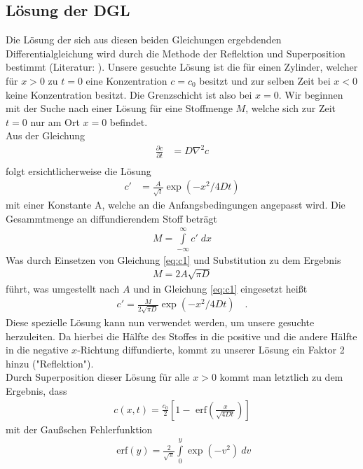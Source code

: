 \documentclass[12pt,a4paper,titlepage,headinclude,bibtotoc]{scrartcl}
\newcommand{\erf}[1]{\text{ erf}\ensuremath{\left( #1 \right)}}
\begin{document}
\subsection{Lösung der DGL}
Die Lösung der sich aus diesen beiden Gleichungen ergebdenden Differentialgleichung wird durch die Methode der Reflektion und Superposition bestimmt (Literatur: \cite[S. 11]{crank}).
Unsere gesuchte Lösung ist die für einen Zylinder, welcher für $x>0$ zu $t=0$ eine Konzentration $c=c_0$ besitzt und zur selben Zeit bei $x<0$ keine Konzentration besitzt.
Die Grenzschicht ist also bei $x=0$.
Wir beginnen mit der Suche nach einer Lösung für eine Stoffmenge $M$, welche sich zur Zeit $t=0$ nur am Ort $x=0$ befindet.\\
Aus der Gleichung
\begin{align*}
\frac{\partial c}{\partial t}&=D\nabla^2 c\\
\end{align*}
folgt ersichtlicherweise die Lösung
\begin{align}
c'&=\frac{A}{\sqrt{t}}\exp\left(-x^2/4Dt \right)\label{eq:c1}
\end{align}
mit einer Konstante A, welche an die Anfangsbedingungen angepasst wird.
Die Gesammtmenge an diffundierendem Stoff beträgt
\begin{align*}
M=\int\limits_{-\infty}^\infty c' \; dx
\end{align*}
Was durch Einsetzen von Gleichung \eqref{eq:c1} und Substitution zu dem Ergebnis
\begin{align*}
M=2A\sqrt{\pi D}
\end{align*}
führt, was umgestellt nach $A$ und in Gleichung \eqref{eq:c1} eingesetzt heißt
\begin{align*}
c'=\frac{M}{2\sqrt{\pi D}}\exp\left(-x^2/4Dt\right)\quad .
\end{align*}
Diese spezielle Lösung kann nun verwendet werden, um unsere gesuchte herzuleiten.
Da hierbei die Hälfte des Stoffes in die positive und die andere Hälfte in die negative $x$-Richtung diffundierte, kommt zu unserer Lösung ein Faktor 2 hinzu ("Reflektion").\\
Durch Superposition dieser Lösung für alle $x>0$ kommt man letztlich zu dem Ergebnis, dass
\begin{align}
c(x,t)=\frac{c_0}{2}\left[1-\erf{\frac{x}{\sqrt{4Dt}}}\right] \label{eq:c}
\end{align}
mit der Gaußschen Fehlerfunktion
\begin{align*}
\erf{y}=\frac{2}{\sqrt{\pi}}\int\limits_0^y\exp\left(-v^2\right)~dv
\end{align*}
\end{document}
